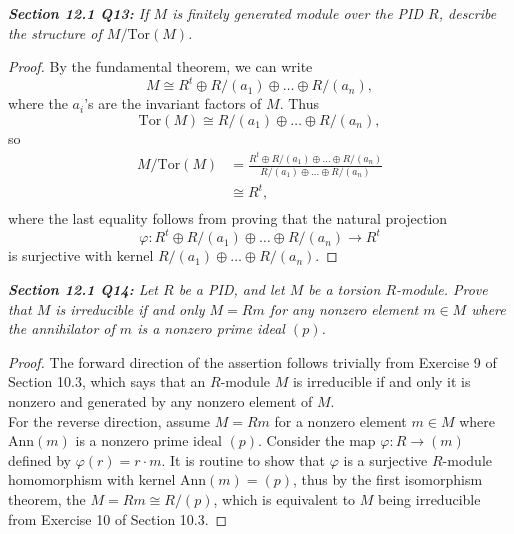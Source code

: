 \documentclass{article}
\begin{document}
\it \textbf{Section 12.1 Q13:} If $M$ is finitely generated module over the
  PID $R$, describe the structure of $M/\text{Tor}(M)$.
  \begin{proof}
    By the fundamental theorem, we can write
    \[M\cong R^t \oplus R/(a_1)\oplus\ldots \oplus R/(a_n),\]
    where the $a_i$'s are the invariant factors of $M$. Thus
    \[\text{Tor}(M) \cong R/(a_1)\oplus\ldots \oplus R/(a_n),\]
    so
    \begin{align*}
      M/\text{Tor}(M) &=\frac{R^t \oplus R/(a_1)\oplus\ldots \oplus R/(a_n)}
        {R/(a_1)\oplus\ldots \oplus R/(a_n)}\\
      &\cong R^t,\\
    \end{align*}
    where the last equality follows from proving that the natural
    projection \[\varphi:R^t \oplus R/(a_1)\oplus\ldots \oplus R/(a_n)
    \rightarrow R^t\] is surjective with kernel $R/(a_1)\oplus\ldots \oplus
    R/(a_n)$.
  \end{proof}

\it \textbf{Section 12.1 Q14:} Let $R$ be a PID, and let $M$ be a torsion
  $R$-module. Prove that $M$ is irreducible if and only $M=Rm$ for any
  nonzero element $m\in M$ where the annihilator of $m$ is a nonzero prime
  ideal $(p)$.

  \begin{proof}
    The forward direction of the assertion follows trivially from Exercise
    9 of Section 10.3, which says that an $R$-module $M$ is irreducible if
    and only it is nonzero and generated by any nonzero element of $M$. \\

    For the reverse direction, assume $M=Rm$ for a nonzero element $m\in M$
    where $\text{Ann}(m)$ is a nonzero prime ideal $(p)$. Consider the map
    $\varphi:R\rightarrow(m)$ defined by $\varphi(r)=r\cdot m$. It is
    routine to show that $\varphi$ is a surjective $R$-module homomorphism
    with kernel $\text{Ann}(m)=(p)$, thus by the first isomorphism theorem,
    the $M=Rm\cong R/(p)$, which is equivalent to $M$ being irreducible
    from Exercise 10 of Section 10.3.
  \end{proof}
\end{document}
